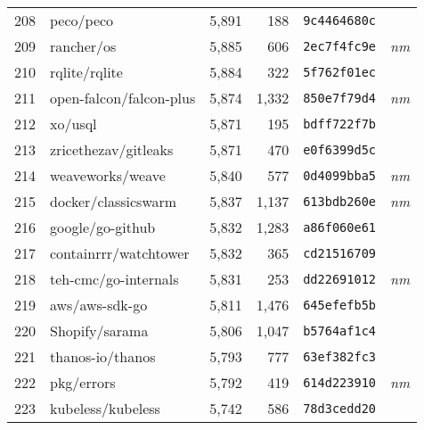 {\begin{supertabular}{llrrll}
        208 &                          peco/peco &  5,891 &    188 &  \texttt{9c4464680c} &              \\
        209 &                         rancher/os &  5,885 &    606 &  \texttt{2ec7f4fc9e} &  \textit{nm} \\
        210 &                      rqlite/rqlite &  5,884 &    322 &  \texttt{5f762f01ec} &              \\
        211 &            open-falcon/falcon-plus &  5,874 &  1,332 &  \texttt{850e7f79d4} &  \textit{nm} \\
        212 &                            xo/usql &  5,871 &    195 &  \texttt{bdff722f7b} &              \\
        213 &               zricethezav/gitleaks &  5,871 &    470 &  \texttt{e0f6399d5c} &              \\
        214 &                   weaveworks/weave &  5,840 &    577 &  \texttt{0d4099bba5} &  \textit{nm} \\
        215 &                docker/classicswarm &  5,837 &  1,137 &  \texttt{613bdb260e} &  \textit{nm} \\
        216 &                   google/go-github &  5,832 &  1,283 &  \texttt{a86f060e61} &              \\
        217 &              containrrr/watchtower &  5,832 &    365 &  \texttt{cd21516709} &              \\
        218 &               teh-cmc/go-internals &  5,831 &    253 &  \texttt{dd22691012} &  \textit{nm} \\
        219 &                     aws/aws-sdk-go &  5,811 &  1,476 &  \texttt{645efefb5b} &              \\
        220 &                     Shopify/sarama &  5,806 &  1,047 &  \texttt{b5764af1c4} &              \\
        221 &                   thanos-io/thanos &  5,793 &    777 &  \texttt{63ef382fc3} &              \\
        222 &                         pkg/errors &  5,792 &    419 &  \texttt{614d223910} &  \textit{nm} \\
        223 &                  kubeless/kubeless &  5,742 &    586 &  \texttt{78d3cedd20} &              \\

\end{supertabular}}
